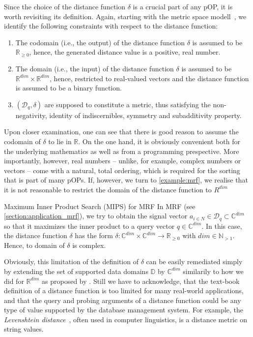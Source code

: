 Since the choice of the distance function $\delta$ is a crucial part of any pOP, it is worth revisiting its definition. Again, starting with the metric space modell~\cite{Zezula:2006similarity}, we identify the following constraints with respect to the distance function:

\begin{enumerate}
    \item The codomain (i.e., the output) of the distance function $\delta$ is assumed to be $\mathbb{R}_{\geq 0}$, hence, the generated distance value is a positive, real number.
    \item The domain (i.e., the input) of the distance function $\delta$ is assumed to be $\mathbb{R}^{dim} \times \mathbb{R}^{dim}$, hence, restricted to real-valued vectors and the distance function is assumed to be a binary function.
    \item $(\mathcal{D}_q,\delta)$ are supposed to constitute a metric, thus satisfying the non-negativity, identity of indiscernibles, symmetry and subadditivity property.
\end{enumerate}

Upon closer examination, one can see that there is good reason to assume the codomain of $\delta$ to lie in $\mathbb{R}$. On the one hand, it is obviously convenient both for the underlying mathematics as well as from a programming prespective. More importantly, however, real numbers -- unlike, for example, complex numbers or vectors -- come with a natural, total ordering, which is required for the sorting that is part of many pOPs. If, however, we turn to \cref{example:mrf}, we realise that it is not reasonable to restrict the domain of the distance function to $R^{dim}$

\begin{example}[label=example:mrf]{Maximum Inner Product Search (MIPS) for MRF}{}
    In MRF (see \cref{section:application_mrf}), we try to obtain the signal vector $a_{i \in N} \in \mathcal{D}_q \subset \mathbb{C}^{dim}$ so that it maximizes the inner product to a query vector $q \in \mathbb{C}^{dim}$. In this case, the distance function $\delta$ has the form $\delta \colon \mathbb{C}^{dim} \times \mathbb{C}^{dim} \to \mathbb{R}_{\geq 0}$ with $dim \in \mathbb{N}_{>1}$. Hence, to domain of $\delta$ is complex.
\end{example}

Obviously, this limitation of the definition of $\delta$ can be easily remediated simply by extending the set of supported data domains $\mathbb{D}$ by $\mathbb{C}^{dim}$ similarily to how we did for $\mathbb{R}^{dim}$ as proposed by \cite{Giangreco:2018thesis}. Still we have to acknowledge, that the text-book definition of a distance function is too limited for many real-world applications, and that the query and probing arguments of a distance function could be any type of value supported by the database management system. For example, the \emph{Levenshtein distance}~\cite{Levensthtein:1965Binary}, often used in computer linguistics, is a distance metric on string values.

